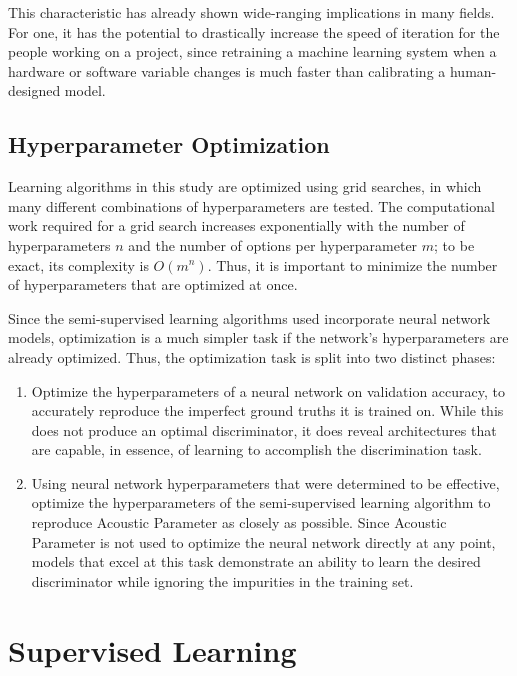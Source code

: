 \documentclass[10pt]{article}
\begin{document}
This characteristic has already shown wide-ranging implications in many fields. For one, it has the potential to drastically increase the speed of iteration for the people working on a project, since retraining a machine learning system when a hardware or software variable changes is much faster than calibrating a human-designed model.

\subsection{Hyperparameter Optimization}

Learning algorithms in this study are optimized using grid searches, in which many different combinations of hyperparameters are tested. The computational work required for a grid search increases exponentially with the number of hyperparameters $n$ and the number of options per hyperparameter $m$; to be exact, its complexity is $O(m^{n})$. Thus, it is important to minimize the number of hyperparameters that are optimized at once.

Since the semi-supervised learning algorithms used incorporate neural network models, optimization is a much simpler task if the network's hyperparameters are already optimized. Thus, the optimization task is split into two distinct phases:

\begin{enumerate}
    \item Optimize the hyperparameters of a neural network on validation accuracy, to accurately reproduce the imperfect ground truths it is trained on. While this does not produce an optimal discriminator, it does reveal architectures that are capable, in essence, of learning to accomplish the discrimination task.
    \item Using neural network hyperparameters that were determined to be effective, optimize the hyperparameters of the semi-supervised learning algorithm to reproduce Acoustic Parameter as closely as possible. Since Acoustic Parameter is not used to optimize the neural network directly at any point, models that excel at this task demonstrate an ability to learn the desired discriminator while ignoring the impurities in the training set.
\end{enumerate}

\section{Supervised Learning}
\end{document}
